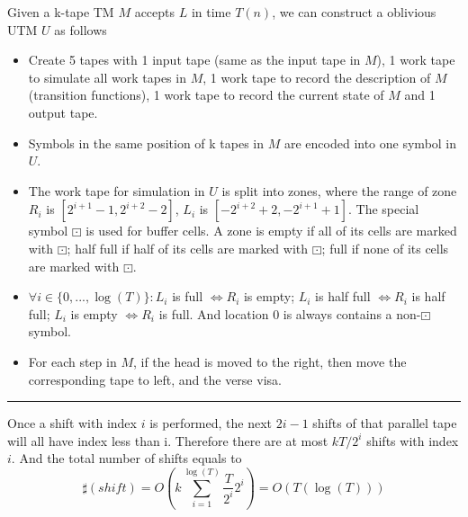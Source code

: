 \documentclass[twoside]{article}
\newenvironment{problem}[2][Problem]{\begin{trivlist}
		\item[\hskip \labelsep {\bfseries #1}\hskip \labelsep {\bfseries #2.}]}{\end{trivlist}}
\newenvironment{solution}{{\bf Solution:}}{\hfill\rule{2mm}{2mm}}
\begin{document}
\begin{problem}{1.6}
\end{problem} 
\begin{solution}
	Given a k-tape TM $M$ accepts $L$ in time $T(n)$, we can construct a oblivious UTM $U$ as follows
	\begin{itemize}
		\item Create 5 tapes with 1 input tape (same as the input tape in $M$), 1 work tape to simulate all work tapes in $M$, 1 work tape to record the description of $M$ (transition functions), 1 work tape to record the current state of $M$ and 1 output tape.
		\item Symbols in the same position of k tapes in $M$ are encoded into one symbol in $U$.
		\item The work tape for simulation in $U$ is split into zones, where the range of zone $R_i$ is $[2^{i+1}-1,2^{i+2}-2]$, $L_i$ is $[-2^{i+2}+2,-2^{i+1}+1]$. The special symbol $\boxdot$ is used for buffer cells. A zone is empty if all of its cells are marked with $\boxdot$; half full if half of its cells are marked with $\boxdot$; full if none of its cells are marked with $\boxdot$.
		\item $\forall i\in \{0,...,\log(T) \}: L_i$ is full $\Leftrightarrow R_i$ is empty;  $L_i$ is half full $\Leftrightarrow R_i$ is half full; $ L_i$ is empty $\Leftrightarrow R_i$ is full. And location 0 is always contains a non-$\boxdot$ symbol.
		\item For each step in $M$, if the head is moved to the right, then move the corresponding tape to left, and the verse visa.
	\end{itemize}
\end{solution}
Once a shift with index $i$ is performed, the next $2i-1$ shifts of that parallel tape will all have index less than i.
Therefore there are at most $kT/2^i$ shifts with index $i$. And the total number of shifts equals to 
$$
\sharp(shift) = O\left( k\sum_{i=1}^{\log(T)} \frac{T}{2^i}2^i \right) = O(T(\log(T)))
$$
\end{document}
